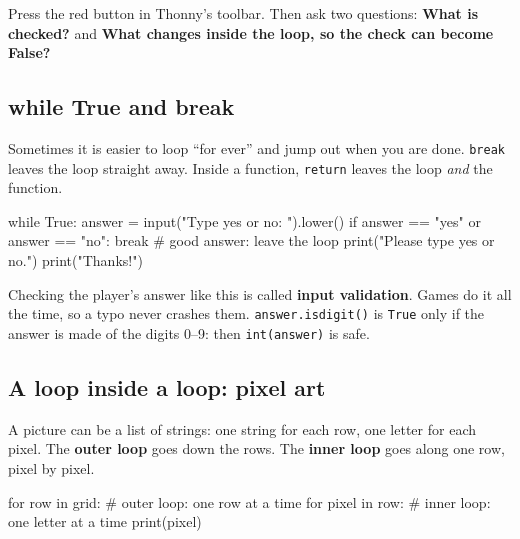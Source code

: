\begin{tip}
Press the red  button in Thonny's toolbar. Then ask two questions:
\textbf{What is checked?} and \textbf{What changes inside the loop, so the check can become False?}
\end{tip}

\subsection{while True and break}
Sometimes it is easier to loop \enquote{for ever} and jump out when you are done. \texttt{break} leaves the loop straight away.
Inside a function, \texttt{return} leaves the loop \emph{and} the function.
\begin{pycode}
while True:
    answer = input("Type yes or no: ").lower()
    if answer == "yes" or answer == "no":
        break                       # good answer: leave the loop
    print("Please type yes or no.")
print("Thanks!")
\end{pycode}
Checking the player's answer like this is called \textbf{input validation}. Games do it all the time, so a typo never crashes them.
\texttt{answer.isdigit()} is \texttt{True} only if the answer is made of the digits 0--9: then \texttt{int(answer)} is safe.

\subsection{A loop inside a loop: pixel art}
A picture can be a list of strings: one string for each row, one letter for each pixel.
The \textbf{outer loop} goes down the rows. The \textbf{inner loop} goes along one row, pixel by pixel.

\begin{center}
\end{center}
\begin{pycode}
for row in grid:            # outer loop: one row at a time
    for pixel in row:       # inner loop: one letter at a time
        print(pixel)
\end{pycode}

